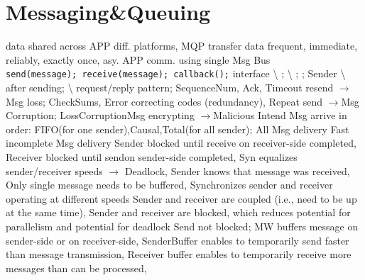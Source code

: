 \section{Messaging\&Queuing}
data shared across APP diff. platforms, 
MQP transfer data frequent, immediate, reliably, 
exactly once, asy.
APP comm. using single Msg Bus
\\
\lstinline{send(message); receive(message); callback();}
interface
\textbackslash
{};
\textbackslash
{};
;
Sender 
\textbackslash
{}
after sending;
\textbackslash
{}
request/reply pattern;
\textbar \textbar \textbar
{}
SequenceNum,
Ack, 
Timeout resend
$\rightarrow$Msg loss;
CheckSums, 
Error correcting codes (redundancy),
Repeat send
$\rightarrow$Msg Corruption;
Loss\redtext{+}Corruption\redtext{+}Msg encrypting
$\rightarrow$Malicious Intend
Msg arrive in order:
FIFO(for one sender),Causal,Total(for all sender);
All Msg delivery
Fast incomplete Msg delivery
\textbar {}
Sender blocked until receive on receiver-side completed,
Receiver blocked until sendon sender-side completed,
Syn equalizes sender/receiver speeds $\rightarrow$ Deadlock,
\btext{+:}
Sender knows that message was received,
Only single message needs to be buffered,
Synchronizes sender and receiver operating at different speeds
\btext{-:}
Sender and receiver are coupled (i.e., need to be up at the same time),
Sender and receiver are blocked, which reduces potential for parallelism and potential for deadlock
\textbar {}
Send not blocked; MW buffers message on sender-side or on receiver-side,
SenderBuffer enables to temporarily send faster than message transmission,
Receiver buffer enables to temporarily receive more messages than can be processed,

